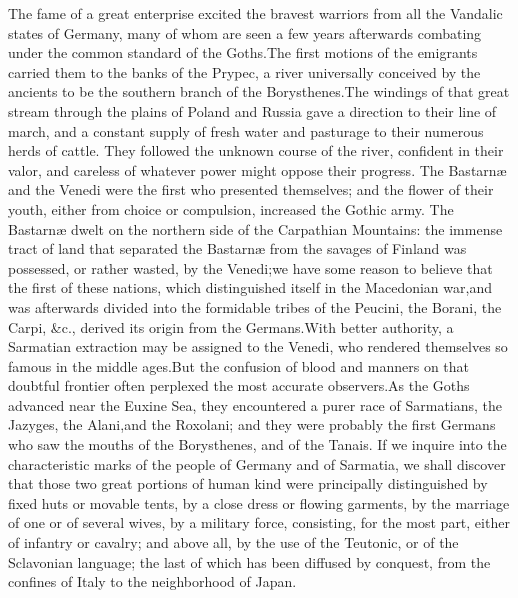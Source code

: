 The fame of a great enterprise excited the bravest warriors from
all the Vandalic states of Germany, many of whom are seen a few
years afterwards combating under the common standard of the
Goths.\footnotemark[22] The first motions of the emigrants carried them to the
banks of the Prypec, a river universally conceived by the
ancients to be the southern branch of the Borysthenes.\footnotemark[23] The
windings of that great stream through the plains of Poland and
Russia gave a direction to their line of march, and a constant
supply of fresh water and pasturage to their numerous herds of
cattle. They followed the unknown course of the river, confident
in their valor, and careless of whatever power might oppose their
progress. The Bastarnæ and the Venedi were the first who
presented themselves; and the flower of their youth, either from
choice or compulsion, increased the Gothic army. The Bastarnæ
dwelt on the northern side of the Carpathian Mountains: the
immense tract of land that separated the Bastarnæ from the
savages of Finland was possessed, or rather wasted, by the
Venedi;\footnotemark[24] we have some reason to believe that the first of these
nations, which distinguished itself in the Macedonian war,\footnotemark[25] and
was afterwards divided into the formidable tribes of the Peucini,
the Borani, the Carpi, \&c., derived its origin from the Germans.\footnotemark[251]
With better authority, a Sarmatian extraction may be assigned
to the Venedi, who rendered themselves so famous in the middle
ages.\footnotemark[26] But the confusion of blood and manners on that doubtful
frontier often perplexed the most accurate observers.\footnotemark[27] As the
Goths advanced near the Euxine Sea, they encountered a purer race
of Sarmatians, the Jazyges, the Alani,\footnotemark[271] and the Roxolani; and
they were probably the first Germans who saw the mouths of the
Borysthenes, and of the Tanais. If we inquire into the
characteristic marks of the people of Germany and of Sarmatia, we
shall discover that those two great portions of human kind were
principally distinguished by fixed huts or movable tents, by a
close dress or flowing garments, by the marriage of one or of
several wives, by a military force, consisting, for the most
part, either of infantry or cavalry; and above all, by the use of
the Teutonic, or of the Sclavonian language; the last of which
has been diffused by conquest, from the confines of Italy to the
neighborhood of Japan.


